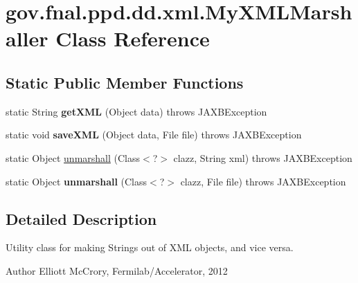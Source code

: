 \hypertarget{classgov_1_1fnal_1_1ppd_1_1dd_1_1xml_1_1MyXMLMarshaller}{\section{gov.\-fnal.\-ppd.\-dd.\-xml.\-My\-X\-M\-L\-Marshaller Class Reference}
\label{classgov_1_1fnal_1_1ppd_1_1dd_1_1xml_1_1MyXMLMarshaller}
}
\subsection*{Static Public Member Functions}
\begin{DoxyCompactItemize}
\item 
\hypertarget{classgov_1_1fnal_1_1ppd_1_1dd_1_1xml_1_1MyXMLMarshaller_a81528df65c4fd7426091e36416e1913f}{static String {\bfseries get\-X\-M\-L} (Object data)  throws J\-A\-X\-B\-Exception }\label{classgov_1_1fnal_1_1ppd_1_1dd_1_1xml_1_1MyXMLMarshaller_a81528df65c4fd7426091e36416e1913f}

\item 
\hypertarget{classgov_1_1fnal_1_1ppd_1_1dd_1_1xml_1_1MyXMLMarshaller_aebf26fd9fce0e6866d13c36ed36408d0}{static void {\bfseries save\-X\-M\-L} (Object data, File file)  throws J\-A\-X\-B\-Exception }\label{classgov_1_1fnal_1_1ppd_1_1dd_1_1xml_1_1MyXMLMarshaller_aebf26fd9fce0e6866d13c36ed36408d0}

\item 
static Object \hyperlink{classgov_1_1fnal_1_1ppd_1_1dd_1_1xml_1_1MyXMLMarshaller_a7b08a6b71a1603e3f4eb7dea6f0402b3}{unmarshall} (Class$<$?$>$ clazz, String xml)  throws J\-A\-X\-B\-Exception 
\item 
\hypertarget{classgov_1_1fnal_1_1ppd_1_1dd_1_1xml_1_1MyXMLMarshaller_a5d210178cc498d18018e6bf535617724}{static Object {\bfseries unmarshall} (Class$<$?$>$ clazz, File file)  throws J\-A\-X\-B\-Exception }\label{classgov_1_1fnal_1_1ppd_1_1dd_1_1xml_1_1MyXMLMarshaller_a5d210178cc498d18018e6bf535617724}

\end{DoxyCompactItemize}


\subsection{Detailed Description}
Utility class for making Strings out of X\-M\-L objects, and vice versa.

\begin{DoxyAuthor}{Author}
Elliott Mc\-Crory, Fermilab/\-Accelerator, 2012 
\end{DoxyAuthor}


